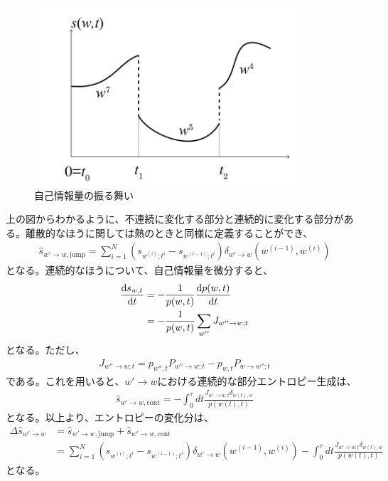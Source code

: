\documentclass[a4paper,11pt]{jsarticle}
\numberwithin{equation}{section}
\begin{document}
\begin{figure}[H]
    \begin{center}
    \includegraphics[width=100mm]{stoen.png}
    \end{center}
    \caption{自己情報量の振る舞い}
    \label{fig:one}
\end{figure}

上の図からわかるように、不連続に変化する部分と連続的に変化する部分がある。離散的なほうに関しては熱のときと同様に定義することができ、
\begin{align}
    \hat{s}_{w' \to w,\text{jump}} = \sum_{i=1}^{N} (s_{w^{(i)};t^i} - s_{w^{(i-1)};t^i})\delta_{w'\to w}(w^{(i-1)}, w^{(i)})
\end{align}
となる。連続的なほうについて、自己情報量を微分すると、
\begin{align}
    \dv{s_{w,t}}{t} &= -\frac{1}{p(w,t)}\dv{p(w,t)}{t}\\
    &= -\frac{1}{p(w,t)}\sum_{w''} J_{w'' \to w; t}
\end{align}
となる。ただし、
\begin{align}
    J_{w'' \to w; t} = p_{w'' ,t} P_{w'' \to w; t}- p_{w,t} P_{w \to w''; t}
\end{align}
である。これを用いると、$w' \to w$における連続的な部分エントロピー生成は、
\begin{align}
    \hat{s}_{w' \to w, \text{cont}} = -\int_{0}^{\tau} dt \frac{J_{w' \to w; t}\delta_{w(t), w}}{p(w(t), t)}
\end{align}
となる。以上より、エントロピーの変化分は、
\begin{align}
    \Delta \hat{s}_{w' \to w} &= \hat{s}_{w' \to w, \text{jump}} + \hat{s}_{w' \to w, \text{cont}}\\
    &= \sum_{i=1}^{N} (s_{w^{(i)};t^i} - s_{w^{(i-1)};t^i})\delta_{w'\to w}(w^{(i-1)}, w^{(i)}) -\int_{0}^{\tau} dt \frac{J_{w' \to w; t}\delta_{w(t), w}}{p(w(t), t)}
\end{align}
となる。\\
\end{document}
